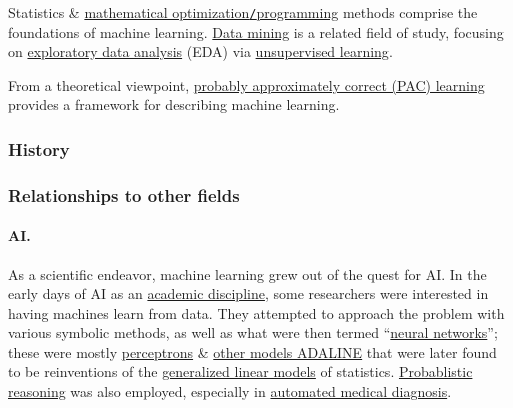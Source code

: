 \documentclass{article}
\begin{document}
Statistics \& \href{https://en.wikipedia.org/wiki/Mathematical_optimization}{mathematical optimization{\tt/}programming} methods comprise the foundations of machine learning. \href{https://en.wikipedia.org/wiki/Data_mining}{Data mining} is a related field of study, focusing on \href{https://en.wikipedia.org/wiki/Exploratory_data_analysis}{exploratory data analysis} (EDA) via \href{https://en.wikipedia.org/wiki/Unsupervised_learning}{unsupervised learning}.

From a theoretical viewpoint, \href{https://en.wikipedia.org/wiki/Probably_approximately_correct_learning}{probably approximately correct (PAC) learning} provides a framework for describing machine learning.

\subsubsection{History}

\subsubsection{Relationships to other fields}

\paragraph{AI.} As a scientific endeavor, machine learning grew out of the quest for AI. In the early days of AI as an \href{https://en.wikipedia.org/wiki/Discipline_(academia)}{academic discipline}, some researchers were interested in having machines learn from data. They attempted to approach the problem with various symbolic methods, as well as what were then termed ``\href{https://en.wikipedia.org/wiki/Artificial_neural_network}{neural networks}''; these were mostly \href{https://en.wikipedia.org/wiki/Perceptron}{perceptrons} \& \href{https://en.wikipedia.org/wiki/ADALINE}{other models ADALINE} that were later found to be reinventions of the \href{https://en.wikipedia.org/wiki/Generalized_linear_model}{generalized linear models} of statistics. \href{https://en.wikipedia.org/wiki/Probabilistic_reasoning}{Probablistic reasoning} was also employed, especially in \href{https://en.wikipedia.org/wiki/Automated_medical_diagnosis}{automated medical diagnosis}.
\end{document}
